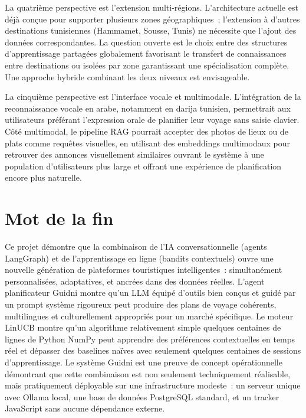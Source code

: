 La quatrième perspective est l'extension multi-régions. L'architecture 
actuelle est déjà conçue pour supporter plusieurs zones géographiques~; 
l'extension à d'autres destinations tunisiennes (Hammamet, Sousse, 
Tunis) ne nécessite que l'ajout des données correspondantes. La 
question ouverte est le choix entre des structures d'apprentissage 
partagées globalement   favorisant le transfert de connaissances 
entre destinations   ou isolées par zone   garantissant une 
spécialisation complète. Une approche hybride combinant les deux 
niveaux est envisageable.

La cinquième perspective est l'interface vocale et multimodale. 
L'intégration de la reconnaissance vocale en arabe, notamment en 
darija tunisien, permettrait aux utilisateurs préférant l'expression 
orale de planifier leur voyage sans saisie clavier. Côté multimodal, 
le pipeline RAG pourrait accepter des photos de lieux ou de plats 
comme requêtes visuelles, en utilisant des embeddings multimodaux 
pour retrouver des annonces visuellement similaires   ouvrant le 
système à une population d'utilisateurs plus large et offrant une 
expérience de planification encore plus naturelle.


\section*{Mot de la fin}

Ce projet démontre que la combinaison de l'IA conversationnelle (agents LangGraph) et de
l'apprentissage en ligne (bandits contextuels) ouvre une nouvelle génération de plateformes
touristiques intelligentes~: simultanément personnalisées, adaptatives, et ancrées dans des
données réelles. L'agent planificateur Guidni montre qu'un LLM équipé d'outils bien conçus
et guidé par un prompt système rigoureux peut produire des plans de voyage cohérents,
multilingues et culturellement appropriés pour un marché spécifique. Le moteur LinUCB montre
qu'un algorithme relativement simple   quelques centaines de lignes de Python NumPy  
peut apprendre des préférences contextuelles en temps réel et dépasser des baselines naïves
avec seulement quelques centaines de sessions d'apprentissage. Le système Guidni est une
preuve de concept opérationnelle démontrant que cette combinaison est non seulement
techniquement réalisable, mais pratiquement déployable sur une infrastructure modeste~:
un serveur unique avec Ollama local, une base de données PostgreSQL standard, et un tracker
JavaScript sans aucune dépendance externe.
